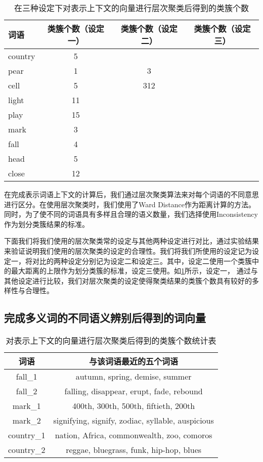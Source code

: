 \begin{longtable}{lccc}
\caption[在三种不同的设定下层次聚类所得到的类簇个数]{在三种设定下对表示上下文的向量进行层次聚类后得到的类簇个数}
\label{tab:num4hc} \\
\toprule[1.5pt]
词语 & 类簇个数（设定一） & 类簇个数（设定二） & 类簇个数（设定三） \\
\midrule[1pt]
country	&	5	&	& \\
pear	&	1	&	3	& \\
cell	&	5	&	312	& \\
light	&	11	&	& \\
play	&	15	&	& \\
mark	&	3	&	& \\
fall	&	4	&	& \\
head	&	5	&	& \\
close	&	12	&	& \\
\endfirsthead
\end{longtable}

在完成表示词语上下文的计算后，我们通过层次聚类算法来对每个词语的不同意思进行区分。在使用层次聚类时，我们使用了Ward Distance\cite{ward1963hierarchical}作为距离计算的方法。同时，为了使不同的词语具有多样且合理的语义数量，我们选择使用Inconsistency作为划分类簇结果的标准。

下面我们将我们使用的层次聚类常的设定与其他两种设定进行对比，通过实验结果来验证说明我们使用的层次聚类的设定的合理性。我们将我们所使用的设定记为设定一，将对比的两种设定分别记为设定二和设定三。其中，设定二使用一个类簇中的最大距离的上限作为划分类簇的标准，设定三使用。如\ref{tab:num4hc}所示，设定一，
通过与其他设定进行比较，我们对层次聚类的设定使得聚类结果的类簇个数具有较好的多样性与合理性。

\subsection{完成多义词的不同语义辨别后得到的词向量}

\begin{longtable}{cc}
\caption[与多义词不同语义对应词向量距离最近的词语]{对表示上下文的向量进行层次聚类后得到的类簇个数统计表}
\label{tab:near4demo} \\
\toprule[1.5pt]
词语 & 与该词语最近的五个词语 \\
\midrule[1pt]
fall\_1	& autumn, spring, demise, summer\\
fall\_2 	& falling, disappear, erupt, fade, rebound\\
mark\_1	& 400th, 300th, 500th, fiftieth, 200th\\
mark\_2	& signifying, signify, zodiac, syllable, auspicious\\
country\_1	&	nation, Africa, commonwealth, zoo, comoros\\
country\_2	&	reggae, bluegrass, funk, hip-hop, blues\\
\endfirsthead
\end{longtable}

